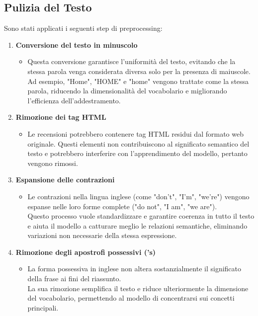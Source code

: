 \documentclass[a4paper, 12pt]{article}
\begin{document}
\subsection{Pulizia del Testo}
Sono stati applicati i seguenti step di preprocessing:

\begin{enumerate}
    \item \textbf{Conversione del testo in minuscolo}
    \begin{itemize}
        \item Questa conversione garantisce l'uniformità del testo, evitando che la stessa parola venga considerata diversa solo per la presenza di maiuscole.\\Ad esempio, "Home", "HOME" e "home" vengono trattate come la stessa parola, riducendo la dimensionalità del vocabolario e migliorando l'efficienza dell'addestramento.
    \end{itemize}

    \item \textbf{Rimozione dei tag HTML}
    \begin{itemize}
        \item Le recensioni potrebbero contenere tag HTML residui dal formato web originale. 
        Questi elementi non contribuiscono al significato semantico del testo e potrebbero interferire con l'apprendimento del modello, pertanto vengono rimossi.
    \end{itemize}

    \item \textbf{Espansione delle contrazioni}
    \begin{itemize}
        \item Le contrazioni nella lingua inglese (come "don't", "I'm", "we're") vengono espanse nelle loro forme complete ("do not", "I am", "we are").\\
        Questo processo vuole standardizzare e garantire coerenza in tutto il testo e aiuta il modello a catturare meglio le relazioni semantiche, eliminando variazioni non necessarie della stessa espressione.
    \end{itemize}

    \item \textbf{Rimozione degli apostrofi possessivi ('s)}
    \begin{itemize}
        \item La forma possessiva in inglese non altera sostanzialmente il significato della frase ai fini del riassunto.\\ 
        La sua rimozione semplifica il testo e riduce ulteriormente la dimensione del vocabolario, permettendo al modello di concentrarsi sui concetti principali.
    \end{itemize}


\end{enumerate}
\end{document}
